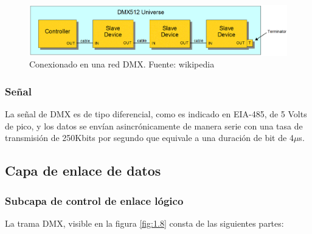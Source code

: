 \begin{figure}[!ht]
	\centering
	\includegraphics[width=15cm,scale=1]{resources/1_7-topologiaDMX.png}
	\caption{Conexionado en una red DMX. Fuente: wikipedia}
	\label{fig:\thefigure}
\end{figure}

\subsubsection{Señal}
La señal de DMX es de tipo diferencial, como es indicado en EIA-485, de 5 Volts de pico, y los datos se envían asincrónicamente de manera serie con una tasa de transmisión de 250Kbits por segundo que equivale a una duración de bit de 4\(\mu \)s.


\subsection{Capa de enlace de datos}
\subsubsection{Subcapa de control de enlace lógico}
La trama DMX, visible en la figura \ref{fig:1.8} consta de las siguientes partes:

